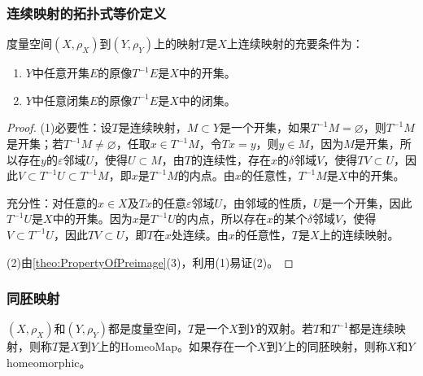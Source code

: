 \subsubsection{连续映射的拓扑式等价定义}
\begin{theorem}
	度量空间$(X,\rho_X)$到$(Y,\rho_Y)$上的映射$T$是$X$上连续映射的充要条件为：
	\begin{enumerate}
		\item $Y$中任意开集$E$的原像$T^{-1}E$是$X$中的开集。
		\item $Y$中任意闭集$E$的原像$T^{-1}E$是$X$中的闭集。
	\end{enumerate}
\end{theorem}
\begin{proof}
	(1)必要性：设$T$是连续映射，$M\subset Y$是一个开集，如果$T^{-1}M=\varnothing$，则$T^{-1}M$是开集；若$T^{-1}M\ne\varnothing$，任取$x\in T^{-1}M$，令$Tx=y$，则$y\in M$，因为$M$是开集，所以存在$y$的$\varepsilon$邻域$U$，使得$U\subset M$，由$T$的连续性，存在$x$的$\delta$邻域$V$，使得$TV\subset U$，因此$V\subset T^{-1}U\subset T^{-1}M$，即$x$是$T^{-1}M$的内点。由$x$的任意性，$T^{-1}M$是$X$中的开集。\par
	充分性：对任意的$x\in X$及$Tx$的任意$\varepsilon$邻域$U$，由邻域的性质，$U$是一个开集，因此$T^{-1}U$是$X$中的开集。因为$x$是$T^{-1}U$的内点，所以存在$x$的某个$\delta$邻域$V$，使得$V\subset T^{-1}U$，因此$TV\subset U$，即$T$在$x$处连续。由$x$的任意性，$T$是$X$上的连续映射。\par
	(2)由\cref{theo:PropertyOfPreimage}(3)，利用(1)易证(2)。
\end{proof}
\subsubsection{同胚映射}
\begin{definition}
	$(X,\rho_X)$和$(Y,\rho_Y)$都是度量空间，$T$是一个$X$到$Y$的双射。若$T$和$T^{-1}$都是连续映射，则称$T$是$X$到$Y$上的\gls{HomeoMap}。如果存在一个$X$到$Y$上的同胚映射，则称$X$和$Y$\gls{homeomorphic}。
\end{definition}